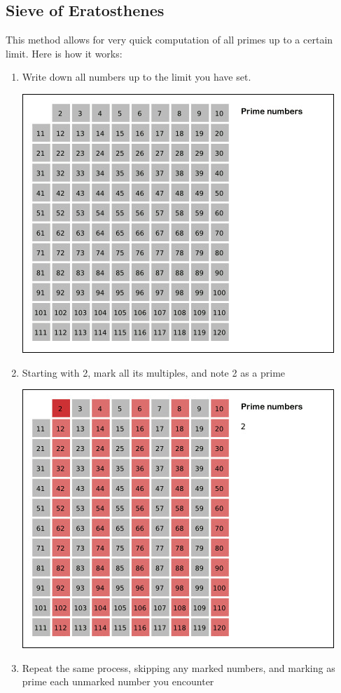 \documentclass[12pt]{article}
\begin{document}
    \subsection{Sieve of Eratosthenes}

    This method allows for very quick computation of all primes up to a certain
    limit. Here is how it works:
    \begin{enumerate}
        \item Write down all numbers up to the limit you have set.

            \includegraphics[scale=0.6]{base}
        \item Starting with 2, mark all its multiples, and note 2 as a prime

            \includegraphics[scale=0.6]{2}\\
        \item Repeat the same process, skipping any marked numbers, and marking
            as prime each unmarked number you encounter


\end{enumerate}
\end{document}
